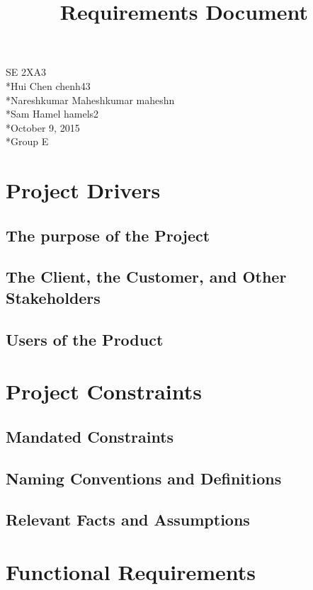\documentclass[12pt]{article}
\begin{document}
	\begin{titlepage}
	\title {Requirements Document}
	\maketitle
		\begin{center}
		SE 2XA3
		\\*Hui Chen 			    chenh43	
		\\*Nareshkumar Maheshkumar	maheshn 
		\\*Sam Hamel				hamels2 
		\\*October 9, 2015
		\\*Group E
		\end{center}
	\end{titlepage}
	
	\newpage
	\tableofcontents
	\listoffigures
	\listoftables

	\newpage
	\section{Project Drivers}
	\subsection{The purpose of the Project}
	\subsection{The Client, the Customer, and Other Stakeholders}
	\subsection{Users of the Product}
	\section{Project Constraints}
	\subsection{Mandated Constraints}
	\subsection{Naming Conventions and Definitions}
	\subsection{Relevant Facts and Assumptions}
	\section{Functional Requirements}
\end{document}
